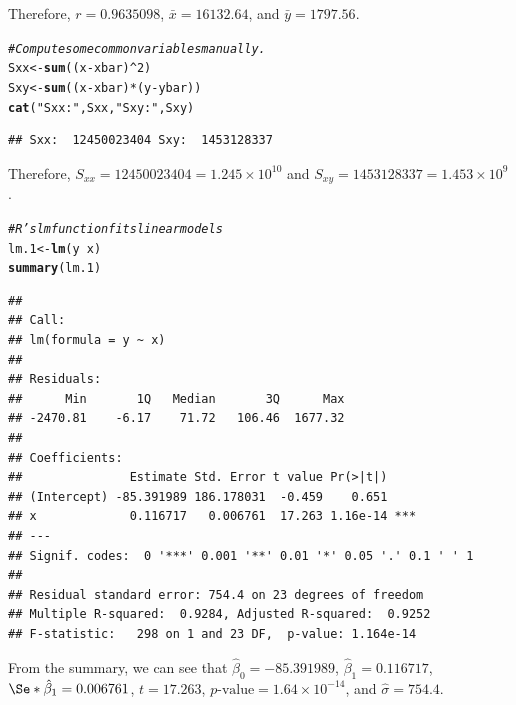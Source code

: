 \documentclass[oneside]{book}\usepackage[]{graphicx}\usepackage[dvipsnames,table,xcdraw]{xcolor}
\makeatletter
\newcommand{\hlnum}[1]{\textcolor[rgb]{0.686,0.059,0.569}{#1}}%
\newcommand{\hlstr}[1]{\textcolor[rgb]{0.192,0.494,0.8}{#1}}%
\newcommand{\hlcom}[1]{\textcolor[rgb]{0.678,0.584,0.686}{\textit{#1}}}%
\newcommand{\hlopt}[1]{\textcolor[rgb]{0,0,0}{#1}}%
\newcommand{\hlstd}[1]{\textcolor[rgb]{0.345,0.345,0.345}{#1}}%
\newcommand{\hlkwb}[1]{\textcolor[rgb]{0.69,0.353,0.396}{#1}}%
\newcommand{\hlkwd}[1]{\textcolor[rgb]{0.737,0.353,0.396}{\textbf{#1}}}%
\newenvironment{kframe}{%
 \def\at@end@of@kframe{}%
 \ifinner\ifhmode%
  \def\at@end@of@kframe{\end{minipage}}%
  \begin{minipage}{\columnwidth}%
 \fi\fi%
 \def\FrameCommand##1{\hskip\@totalleftmargin \hskip-\fboxsep
 \colorbox{shadecolor}{##1}\hskip-\fboxsep
     \hskip-\linewidth \hskip-\@totalleftmargin \hskip\columnwidth}%
 \MakeFramed {\advance\hsize-\width
   \@totalleftmargin\z@ \linewidth\hsize
   \@setminipage}}%
 {\par\unskip\endMakeFramed%
 \at@end@of@kframe}
\newenvironment{knitrout}{}{} %
\makeatother
\begin{document}
Therefore, $r=0.9635098$,
$\bar{x}=16132.64$, and $\bar{y}= 1797.56$.

\begin{knitrout}
\color{fgcolor}\begin{kframe}
\begin{alltt}
\hlcom{# Compute some common variables manually.}
\hlstd{Sxx} \hlkwb{<-} \hlkwd{sum}\hlstd{((x} \hlopt{-} \hlstd{xbar)}\hlopt{^}\hlnum{2}\hlstd{)}
\hlstd{Sxy} \hlkwb{<-} \hlkwd{sum}\hlstd{((x} \hlopt{-} \hlstd{xbar)} \hlopt{*} \hlstd{(y} \hlopt{-} \hlstd{ybar))}
\hlkwd{cat}\hlstd{(}\hlstr{"Sxx: "}\hlstd{, Sxx,} \hlstr{"Sxy: "}\hlstd{, Sxy)}
\end{alltt}
\begin{verbatim}
## Sxx:  12450023404 Sxy:  1453128337
\end{verbatim}
\end{kframe}
\end{knitrout}

Therefore, $S_{xx}=12450023404=1.245\times10^{10}$ and
$S_{xy}=1453128337=1.453\times 10^{9}$.

\begin{knitrout}
\color{fgcolor}\begin{kframe}
\begin{alltt}
\hlcom{# R's lm function fits linear models}
\hlstd{lm.1} \hlkwb{<-} \hlkwd{lm}\hlstd{(y} \hlopt{~} \hlstd{x)}
\hlkwd{summary}\hlstd{(lm.1)}
\end{alltt}
\begin{verbatim}
## 
## Call:
## lm(formula = y ~ x)
## 
## Residuals:
##      Min       1Q   Median       3Q      Max 
## -2470.81    -6.17    71.72   106.46  1677.32 
## 
## Coefficients:
##               Estimate Std. Error t value Pr(>|t|)    
## (Intercept) -85.391989 186.178031  -0.459    0.651    
## x             0.116717   0.006761  17.263 1.16e-14 ***
## ---
## Signif. codes:  0 '***' 0.001 '**' 0.01 '*' 0.05 '.' 0.1 ' ' 1
## 
## Residual standard error: 754.4 on 23 degrees of freedom
## Multiple R-squared:  0.9284,	Adjusted R-squared:  0.9252 
## F-statistic:   298 on 1 and 23 DF,  p-value: 1.164e-14
\end{verbatim}
\end{kframe}
\end{knitrout}

From the summary, we can see that
$\hat{\beta}_0=-85.391989$,
$\hat{\beta}_1=0.116717$,
$\Se*{\hat{\beta}_1}=0.006761$,
$t=17.263$, $p\text{-value}=1.64\times 10^{-14}$, and
$\hat{\sigma}=754.4$.
\end{document}
